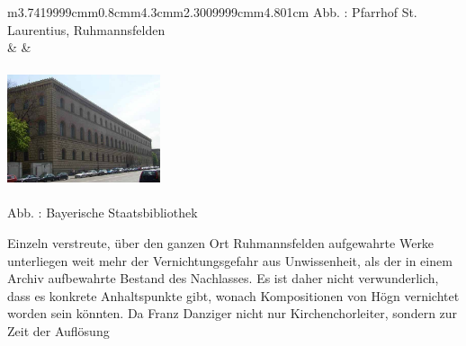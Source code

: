 \begin{flushleft}
\begin{supertabular}{m{3.7419999cm}m{0.8cm}m{4.3cm}m{2.3009999cm}m{4.801cm}}
{Abb. : Pfarrhof St. Laurentius,
Ruhmannsfelden}\\
 &
 &

\includegraphics[width=4.509cm,height=3.491cm]{pictures/zulassungsarbeit-img067.jpg}

Abb. : Bayerische Staatsbibliothek\\
\end{supertabular}
\end{flushleft}
Einzeln verstreute, über den ganzen Ort Ruhmannsfelden aufgewahrte Werke
unterliegen weit mehr der Vernichtungsgefahr aus Unwissenheit, als der
in einem Archiv aufbewahrte Bestand des Nachlasses. Es ist daher nicht
verwunderlich, dass es konkrete Anhaltspunkte gibt, wonach
Kompositionen von Högn vernichtet worden sein könnten. Da Franz
Danziger nicht nur Kirchenchorleiter, sondern zur Zeit der Auflösung
